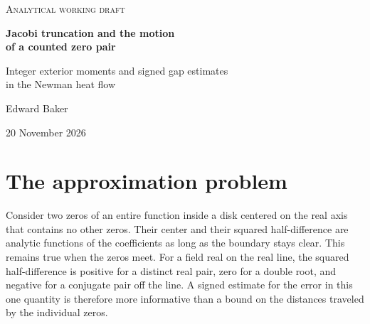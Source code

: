 \documentclass[11pt,letterpaper]{article}
\numberwithin{equation}{section}
\theoremstyle{definition}\newtheorem{definition}[theorem]{Definition}
\theoremstyle{remark}\newtheorem{remark}[theorem]{Remark}
\begin{document}
\thispagestyle{plain}
\begin{center}
{\small\scshape Analytical working draft\par}
\vspace{9pt}
{\LARGE\bfseries Jacobi truncation and the motion\\[3pt] of a counted zero pair\par}
\vspace{7pt}
{\large Integer exterior moments and signed gap estimates\\ in the Newman heat flow\par}
\vspace{10pt}
{\large Edward Baker\par}
\vspace{2pt}
{\small 20 November 2026\par}
\end{center}
\begin{abstract}
A finite Jacobi matrix gives a Gaussian quadrature for the theta measure in the Newman heat flow. As the measure evolves, the first omitted Jacobi link determines the heat defect of this quadrature. We follow that defect to a pair of Fourier zeros isolated by a contour. It acts on every integer exterior moment through the variation of the field and the motion of the two poles of the moment kernel. The resulting equations remain regular at coalescence in symmetric coordinates. A resolvent difference then gives the exact change of the finite field when two sites are added. For the corresponding change of squared half-gap, we isolate a signed linear contour integral and bound its full nonlinear remainder, including the displacement of the pair center. An explicit compact positive density yields increments of both signs infinitely often on each degree parity. For the canonical theta source, a separate interval certificate resolves a negative degree-24 correction on one physical-time interval. The sharper direct enclosure on that same interval identifies the remaining question of how much complete-source information a finite degree step can replace.
\end{abstract}
\vspace{0.35em}
\setcounter{tocdepth}{1}
{\small\tableofcontents}
\clearpage

\section{The approximation problem}\label{sec:intro}
Consider two zeros of an entire function inside a disk centered on the real axis that contains no other zeros. Their center and their squared half-difference are analytic functions of the coefficients as long as the boundary stays clear. This remains true when the zeros meet. For a field real on the real line, the squared half-difference is positive for a distinct real pair, zero for a double root, and negative for a conjugate pair off the line. A signed estimate for the error in this one quantity is therefore more informative than a bound on the distances traveled by the individual zeros.
\end{document}
